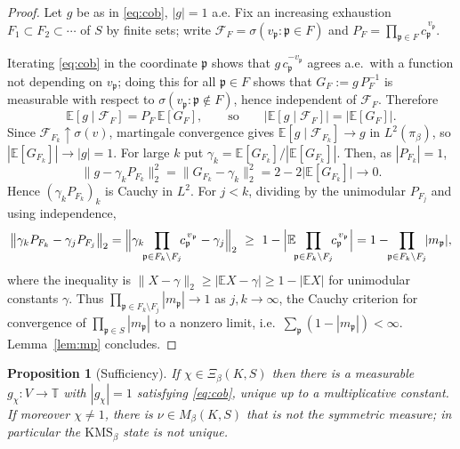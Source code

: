 \documentclass[11pt]{amsart}
\numberwithin{equation}{section}
\newtheorem{proposition}[theorem]{Proposition}
\theoremstyle{definition}
\theoremstyle{remark}
\newcommand{\T}{\mathbb{T}}
\newcommand{\cF}{\mathcal{F}}
\newcommand{\pp}{\mathfrak{p}}
\begin{document}
\begin{proof}
Let $g$ be as in \eqref{eq:cob}, $|g|=1$ a.e. Fix an increasing exhaustion
$F_1\subset F_2\subset\cdots$ of $S$ by finite sets; write
$\cF_F=\sigma(v_\pp:\pp\in F)$ and $P_F=\prod_{\pp\in F}c_\pp^{\,v_\pp}$.

Iterating \eqref{eq:cob} in the coordinate $\pp$ shows that $g\,c_\pp^{-v_\pp}$
agrees a.e.\ with a function not depending on $v_\pp$; doing this for all
$\pp\in F$ shows that $G_F:=g\,P_F^{-1}$ is measurable with respect to
$\sigma(v_\pp:\pp\notin F)$, hence independent of $\cF_F$. Therefore
\[
\mathbb E[g\mid\cF_F]=P_F\,\mathbb E[G_F],\qquad\text{so}\qquad\bigl|\mathbb E[g\mid\cF_F]\bigr|=\bigl|\mathbb E[G_F]\bigr| .
\]
Since $\cF_{F_k}\uparrow\sigma(v)$, martingale convergence gives
$\mathbb E[g\mid\cF_{F_k}]\to g$ in $L^2(\pi_\beta)$, so
$|\mathbb E[G_{F_k}]|\to|g|=1$. For large $k$ put
$\gamma_k=\mathbb E[G_{F_k}]/|\mathbb E[G_{F_k}]|$. Then, as $|P_{F_k}|=1$,
\[
\bigl\|g-\gamma_kP_{F_k}\bigr\|_2^2=\bigl\|G_{F_k}-\gamma_k\bigr\|_2^2=2-2\bigl|\mathbb E[G_{F_k}]\bigr|\longrightarrow0 .
\]
Hence $(\gamma_kP_{F_k})_k$ is Cauchy in $L^2$. For $j<k$, dividing by the
unimodular $P_{F_j}$ and using independence,
\[
\bigl\|\gamma_kP_{F_k}-\gamma_jP_{F_j}\bigr\|_2
=\Bigl\|\gamma_k\!\!\prod_{\pp\in F_k\setminus F_j}\!\!c_\pp^{\,v_\pp}-\gamma_j\Bigr\|_2
\ \ge\ 1-\Bigl|\mathbb E\!\!\prod_{\pp\in F_k\setminus F_j}\!\!c_\pp^{\,v_\pp}\Bigr|
=1-\!\!\prod_{\pp\in F_k\setminus F_j}\!\!|m_\pp| ,
\]
where the inequality is $\|X-\gamma\|_2\ge|\mathbb E X-\gamma|\ge1-|\mathbb E X|$
for unimodular constants $\gamma$. Thus
$\prod_{\pp\in F_k\setminus F_j}|m_\pp|\to1$ as $j,k\to\infty$, the Cauchy
criterion for convergence of $\prod_{\pp\in S}|m_\pp|$ to a nonzero limit, i.e.\
$\sum_\pp(1-|m_\pp|)<\infty$. Lemma~\ref{lem:mp} concludes.
\end{proof}

\begin{proposition}[Sufficiency]\label{prop:suff}
If $\chi\in\Xi_\beta(K,S)$ then there is a measurable $g_\chi:V\to\T$ with
$|g_\chi|=1$ satisfying \eqref{eq:cob}, unique up to a multiplicative constant.
If moreover $\chi\neq1$, there is $\nu\in M_\beta(K,S)$ that is not the
symmetric measure; in particular the $\mathrm{KMS}_\beta$ state is not unique.
\end{proposition}
\end{document}
